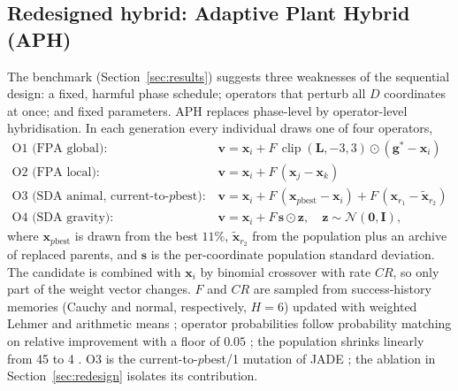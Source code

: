 \documentclass[10pt,letterpaper]{article}
\newcommand{\clip}{\operatorname{clip}}
\begin{document}
\subsection{Redesigned hybrid: Adaptive Plant Hybrid (APH)}\label{sec:aph}
The benchmark (Section~\ref{sec:results}) suggests three weaknesses of the sequential design: a fixed, harmful phase schedule; operators that perturb all $D$ coordinates at once; and fixed parameters. APH replaces phase-level by operator-level hybridisation. In each generation every individual draws one of four operators,
\begin{align*}
\text{O1 (FPA global)}:\ & \mathbf{v}=\mathbf{x}_i+F\,\clip(\mathbf{L},-3,3)\odot(\mathbf{g}^{*}-\mathbf{x}_i)\\
\text{O2 (FPA local)}:\ & \mathbf{v}=\mathbf{x}_i+F\,(\mathbf{x}_j-\mathbf{x}_k)\\
\text{O3 (SDA animal, current-to-}p\text{best)}:\ & \mathbf{v}=\mathbf{x}_i+F\,(\mathbf{x}_{p\mathrm{best}}-\mathbf{x}_i)+F\,(\mathbf{x}_{r_1}-\tilde{\mathbf{x}}_{r_2})\\
\text{O4 (SDA gravity)}:\ & \mathbf{v}=\mathbf{x}_i+F\,\mathbf{s}\odot\mathbf{z},\quad \mathbf{z}\sim\mathcal{N}(\mathbf{0},\mathbf{I}),
\end{align*}
where $\mathbf{x}_{p\mathrm{best}}$ is drawn from the best $11\%$, $\tilde{\mathbf{x}}_{r_2}$ from the population plus an archive of replaced parents, and $\mathbf{s}$ is the per-coordinate population standard deviation. The candidate is combined with $\mathbf{x}_i$ by binomial crossover with rate $CR$, so only part of the weight vector changes. $F$ and $CR$ are sampled from success-history memories (Cauchy and normal, respectively, $H=6$) updated with weighted Lehmer and arithmetic means \citep{tanabe2013shade}; operator probabilities follow probability matching on relative improvement with a floor of $0.05$ \citep{thierens2005aos}; the population shrinks linearly from 45 to 4 \citep{tanabe2014lshade}. O3 is the current-to-$p$best/1 mutation of JADE \citep{zhang2009jade}; the ablation in Section~\ref{sec:redesign} isolates its contribution.
\end{document}
